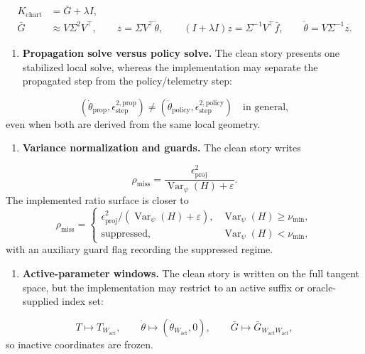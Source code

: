 \documentclass[11pt]{article}
\begin{document}
\[
   \begin{aligned}
   K_{\mathrm{chart}}&=\bar G+\lambda I,\\
   \bar G&\approx V\Sigma^2V^\top,
   \qquad
   z=\Sigma V^\top\dot\theta,
   \qquad
   (I+\lambda I)z=\Sigma^{-1}V^\top\bar f,
   \qquad
   \dot\theta=V\Sigma^{-1}z.
   \end{aligned}
\]

\begin{enumerate}
\item \textbf{Propagation solve versus policy solve.} The clean story presents one stabilized local solve, whereas the implementation may separate the propagated step from the policy/telemetry step:
\end{enumerate}

\[
   (\dot\theta_{\mathrm{prop}},\epsilon_{\mathrm{step}}^{2,\mathrm{prop}})
   \neq
   (\dot\theta_{\mathrm{policy}},\epsilon_{\mathrm{step}}^{2,\mathrm{policy}})
   \quad\text{in general},
\]
   even when both are derived from the same local geometry.

\begin{enumerate}
\item \textbf{Variance normalization and guards.} The clean story writes
\end{enumerate}

\[
   \rho_{\mathrm{miss}}=\frac{\epsilon_{\mathrm{proj}}^2}{\operatorname{Var}_\psi(H)+\varepsilon}.
\]
   The implemented ratio surface is closer to
\[
   \rho_{\mathrm{miss}}
   =
   \begin{cases}
   \epsilon_{\mathrm{proj}}^2/(\operatorname{Var}_\psi(H)+\varepsilon),&\operatorname{Var}_\psi(H)\ge \nu_{\min},\\
   \text{suppressed},&\operatorname{Var}_\psi(H)<\nu_{\min},
   \end{cases}
\]
   with an auxiliary guard flag recording the suppressed regime.

\begin{enumerate}
\item \textbf{Active-parameter windows.} The clean story is written on the full tangent space, but the implementation may restrict to an active suffix or oracle-supplied index set:
\end{enumerate}

\[
   T\mapsto T_{W_{\mathrm{act}}},
   \qquad
   \dot\theta\mapsto(\dot\theta_{W_{\mathrm{act}}},0),
   \qquad
   \bar G\mapsto \bar G_{W_{\mathrm{act}}W_{\mathrm{act}}},
\]
   so inactive coordinates are frozen.
\end{document}
